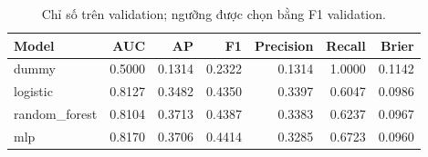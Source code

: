 \begin{table}[H]\centering\small
\caption{Chỉ số trên validation; ngưỡng được chọn bằng F1 validation.}
\begin{tabular}{@{}lrrrrrr@{}}\toprule
Model & AUC & AP & F1 & Precision & Recall & Brier \\\midrule
dummy & 0.5000 & 0.1314 & 0.2322 & 0.1314 & 1.0000 & 0.1142 \\
logistic & 0.8127 & 0.3482 & 0.4350 & 0.3397 & 0.6047 & 0.0986 \\
random\_forest & 0.8104 & 0.3713 & 0.4387 & 0.3383 & 0.6237 & 0.0967 \\
mlp & 0.8170 & 0.3706 & 0.4414 & 0.3285 & 0.6723 & 0.0960 \\
\bottomrule\end{tabular}
\end{table}